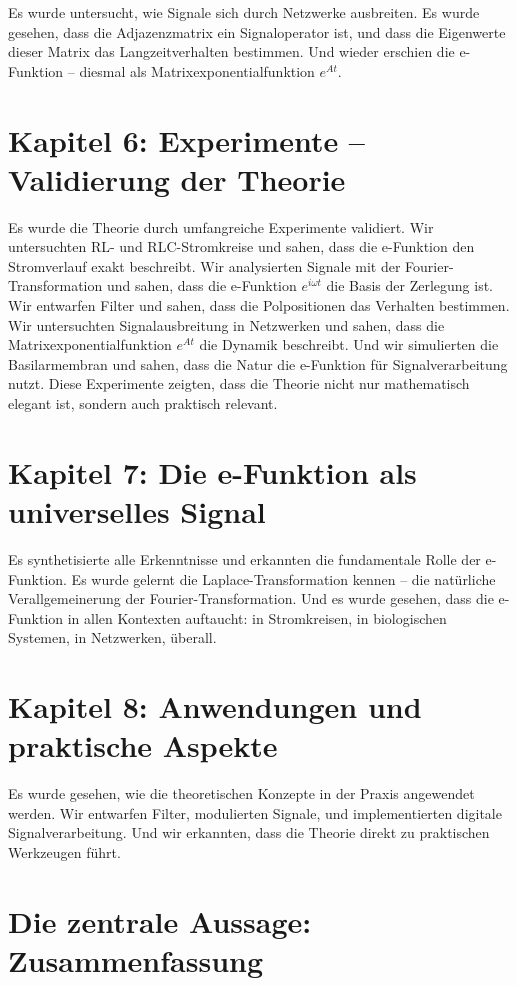 ﻿\documentclass[a4paper,12pt]{report}
\theoremstyle{definition}
\begin{document}
	Es wurde untersucht, wie Signale sich durch Netzwerke ausbreiten. Es wurde gesehen, dass die Adjazenzmatrix ein Signaloperator ist, und dass die Eigenwerte dieser Matrix das Langzeitverhalten bestimmen. Und wieder erschien die e-Funktion -- diesmal als Matrixexponentialfunktion $e^{At}$.
	
	\section{Kapitel 6: Experimente -- Validierung der Theorie}
	
	Es wurde die Theorie durch umfangreiche Experimente validiert. Wir untersuchten RL- und RLC-Stromkreise und sahen, dass die e-Funktion den Stromverlauf exakt beschreibt. Wir analysierten Signale mit der Fourier-Transformation und sahen, dass die e-Funktion $e^{i\omega t}$ die Basis der Zerlegung ist. Wir entwarfen Filter und sahen, dass die Polpositionen das Verhalten bestimmen. Wir untersuchten Signalausbreitung in Netzwerken und sahen, dass die Matrixexponentialfunktion $e^{At}$ die Dynamik beschreibt. Und wir simulierten die Basilarmembran und sahen, dass die Natur die e-Funktion für Signalverarbeitung nutzt. Diese Experimente zeigten, dass die Theorie nicht nur mathematisch elegant ist, sondern auch praktisch relevant.
	
	\section{Kapitel 7: Die e-Funktion als universelles Signal}
	
	Es synthetisierte alle Erkenntnisse und erkannten die fundamentale Rolle der e-Funktion. Es wurde gelernt die Laplace-Transformation kennen -- die natürliche Verallgemeinerung der Fourier-Transformation. Und es wurde gesehen, dass die e-Funktion in allen Kontexten auftaucht: in Stromkreisen, in biologischen Systemen, in Netzwerken, überall.
	
	\section{Kapitel 8: Anwendungen und praktische Aspekte}
	
	Es wurde gesehen, wie die theoretischen Konzepte in der Praxis angewendet werden. Wir entwarfen Filter, modulierten Signale, und implementierten digitale Signalverarbeitung. Und wir erkannten, dass die Theorie direkt zu praktischen Werkzeugen führt.
	
	\section{Die zentrale Aussage: Zusammenfassung}
	
\end{document}
